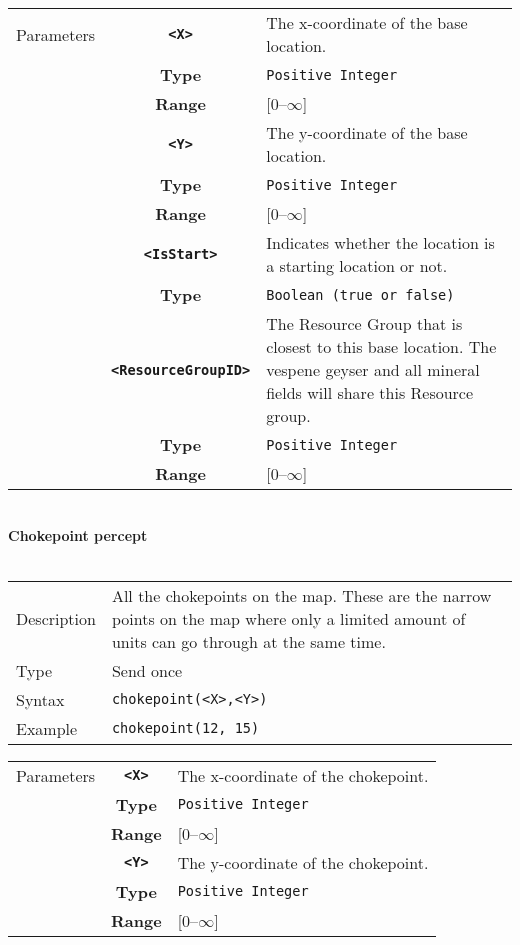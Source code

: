  \begin{tabularx}{\textwidth}{l | c | p{8cm}|}
 \cline{2-3}
 Parameters & \textbf{\verb|<X>|} & The x-coordinate of the base location.\\
            & \textbf{Type} & \verb|Positive Integer| \\
            & \textbf{Range} & [0--$\infty$] \\
            \cline{2-3}
            & \textbf{\verb|<Y>|} & The y-coordinate of the base location.\\
            & \textbf{Type} & \verb|Positive Integer| \\
            & \textbf{Range} & [0--$\infty$] \\
            \cline{2-3}
            & \textbf{\verb|<IsStart>|} & Indicates whether the location is a starting location or not. \\
            & \textbf{Type} & \verb|Boolean (true or false)| \\
            \cline{2-3}
            & \textbf{\verb|<ResourceGroupID>|} & The Resource Group that is closest to this base location. The vespene geyser and all mineral fields will share this Resource group. \\
            & \textbf{Type} & \verb|Positive Integer| \\
            & \textbf{Range} & [0--$\infty$] \\
            \cline{2-3}
\end{tabularx}\\
\newpage
\noindent
\textbf{Chokepoint percept}\\
\\
\begin{tabularx}{\textwidth}{lX}
 Description & All the chokepoints on the map. These are the narrow points on the map where only a limited amount of units can go through at the same time.  \\
 Type & Send once \\
 Syntax & \verb|chokepoint(<X>,<Y>)| \\
 Example & \verb|chokepoint(12, 15)| \\
 \end{tabularx}
 \begin{tabularx}{\textwidth}{l | c | p{8cm}|}
 \cline{2-3}
 Parameters & \textbf{\verb|<X>|} & The x-coordinate of the chokepoint.\\
            & \textbf{Type} & \verb|Positive Integer| \\
            & \textbf{Range} & [0--$\infty$] \\
            \cline{2-3}
            & \textbf{\verb|<Y>|} & The y-coordinate of the chokepoint.\\
            & \textbf{Type} & \verb|Positive Integer| \\
            & \textbf{Range} & [0--$\infty$] \\
            \cline{2-3}
\end{tabularx}\\


